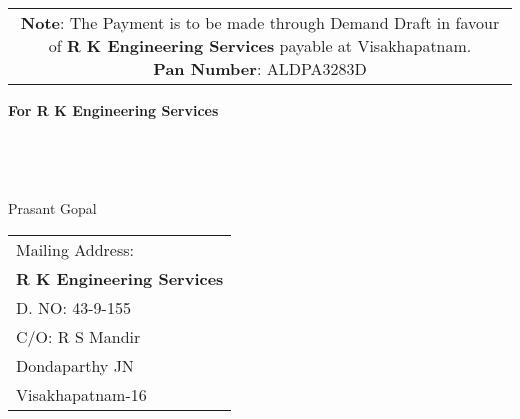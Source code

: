 \documentclass[11pt]{article}
\begin{document}
\vspace*{-1 cm}
\begin{tabular}{c}
\parbox{4in}{ {\bf Note}: The Payment is to be made through Demand Draft in favour of {\bf R K Engineering Services} payable at Visakhapatnam. \\
{\noindent \bf Pan Number}:  ALDPA3283D }\\
\end{tabular}
\vspace*{55pt}


{\bf For  R K Engineering Services } \\ \\ \\ \\ \\
 \hspace*{0.6cm}Prasant Gopal
\vspace*{-71pt}
\begin{flushright}
\begin{tabular}{l}
Mailing Address:\\
{\bf R K Engineering Services}\\
D. NO: 43-9-155\\
C/O: R  S Mandir\\
Dondaparthy JN\\ 
Visakhapatnam-16\\
\end{tabular}
\end{flushright}
\end{document}
